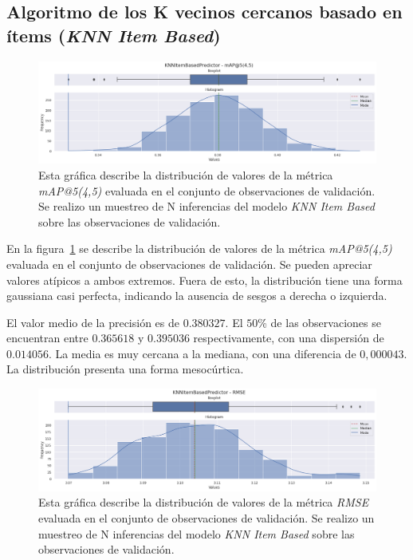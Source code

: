 \documentclass[11pt,a4paper,twoside]{thesis}
\begin{document}
\clearpage

\subsection{
	Algoritmo de los K vecinos cercanos basado
	en ítems (\textit{KNN Item Based})
}

\begin{figure}[!htb]
	\centering
	\includegraphics[width=15cm]{./images/metrics-knn-item-based-mapk.png}
	\caption{
		Esta gráfica describe la distribución de valores de la métrica
		\textit{mAP@5(4,5)} evaluada en el conjunto de observaciones de
		validación. Se realizo un muestreo de N inferencias del modelo
		\textit{KNN Item Based} sobre las observaciones de validación.
	}
	\label{fig:knnItemMAP}
\end{figure}

En la figura~\ref{fig:knnItemMAP} se describe la distribución de valores de la
métrica \textit{mAP@5(4,5)} evaluada en el conjunto de observaciones de
validación. Se pueden apreciar valores atípicos a ambos extremos. Fuera de
esto, la distribución tiene una forma gaussiana casi perfecta, indicando la
ausencia de sesgos a derecha o izquierda.

El valor medio de la precisión es de $0.380327$. El $50$\% de las observaciones
se encuentran entre $0.365618$ y $0.395036$ respectivamente, con una dispersión
de $0.014056$. La media es muy cercana a la mediana, con una diferencia de
$0,000043$. La distribución presenta una forma mesocúrtica.

\clearpage

\begin{figure}[!htb]
	\centering
	\includegraphics[width=15cm]{./images/metrics-knn-item-based-RMSE.png}
	\caption{
		Esta gráfica describe la distribución de valores de la métrica
		\textit{RMSE} evaluada en el conjunto de observaciones de
		validación. Se realizo un muestreo de N inferencias del modelo
		\textit{KNN Item Based} sobre las observaciones de validación.
	}
	\label{fig:knnItemRMSE}
\end{figure}
\end{document}
